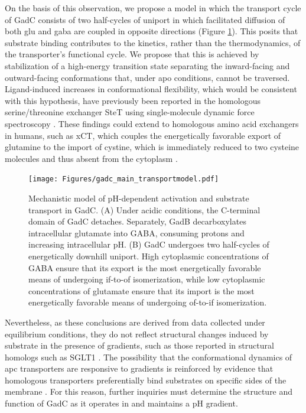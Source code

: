 On the basis of this observation, we propose a model in which the transport cycle of GadC consists of two half-cycles of uniport in which facilitated diffusion of both \gls{glu} and \gls{gaba} are coupled in opposite directions (Figure \ref{fig:gadc_main_transportmodel}). This posits that substrate binding contributes to the kinetics, rather than the thermodynamics, of the transporter's functional cycle. We propose that this is achieved by stabilization of a high-energy transition state separating the inward-facing and outward-facing conformations that, under apo conditions, cannot be traversed. Ligand-induced increases in conformational flexibility, which would be consistent with this hypothesis, have previously been reported in the homologous serine/threonine exchanger SteT using single-molecule dynamic force spectroscopy \citep*{Bippes2009}. These findings could extend to homologous amino acid exchangers in humans, such as xCT, which couples the energetically favorable export of glutamine to the import of cystine, which is immediately reduced to two cysteine molecules and thus absent from the cytoplasm \citep*{Oda2020}.

\begin{figure}[h!]
\centering
\texttt{[image: Figures/gadc\_main\_transportmodel.pdf]}
 \caption[Mechanistic model of pH-dependent activation and substrate transport in GadC.]{Mechanistic model of pH-dependent activation and substrate transport in GadC. (A) Under acidic conditions, the C-terminal domain of GadC detaches. Separately, GadB decarboxylates intracellular glutamate into GABA, consuming protons and increasing intracellular pH. (B) GadC undergoes two half-cycles of energetically downhill uniport. High cytoplasmic concentrations of GABA ensure that its export is the most energetically favorable means of undergoing \gls{if}-to-\gls{of} isomerization, while low cytoplasmic concentrations of glutamate ensure that its import is the most energetically favorable means of undergoing \gls{of}-to-\gls{if} isomerization.}
\label{fig:gadc_main_transportmodel}
\end{figure}

Nevertheless, as these conclusions are derived from data collected under equilibrium conditions, they do not reflect structural changes induced by  substrate in the presence of gradients, such as those reported in structural homologs such as SGLT1 \citep*{Loo1998}. The possibility that the conformational dynamics of \gls{apc} transporters are responsive to gradients is reinforced by evidence that homologous transporters preferentially bind substrates on specific sides of the membrane \citep*{Bartoccioni2019}. For this reason, further inquiries must determine the structure and function of GadC as it operates in and maintains a pH gradient.


